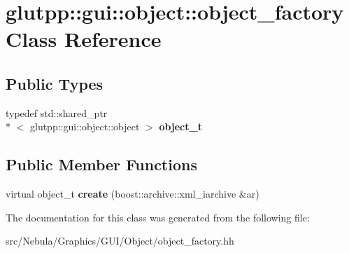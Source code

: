 \hypertarget{classglutpp_1_1gui_1_1object_1_1object__factory}{\section{glutpp\-:\-:gui\-:\-:object\-:\-:object\-\_\-factory Class Reference}
\label{classglutpp_1_1gui_1_1object_1_1object__factory}
}
\subsection*{Public Types}
\begin{DoxyCompactItemize}
\item 
\hypertarget{classglutpp_1_1gui_1_1object_1_1object__factory_a4a6e3b986deecc14be3b9f2f15dbd6f2}{typedef std\-::shared\-\_\-ptr\\*
$<$ glutpp\-::gui\-::object\-::object $>$ {\bfseries object\-\_\-t}}\label{classglutpp_1_1gui_1_1object_1_1object__factory_a4a6e3b986deecc14be3b9f2f15dbd6f2}

\end{DoxyCompactItemize}
\subsection*{Public Member Functions}
\begin{DoxyCompactItemize}
\item 
\hypertarget{classglutpp_1_1gui_1_1object_1_1object__factory_a00a2712a917a187ad3acd41132db8611}{virtual object\-\_\-t {\bfseries create} (boost\-::archive\-::xml\-\_\-iarchive \&ar)}\label{classglutpp_1_1gui_1_1object_1_1object__factory_a00a2712a917a187ad3acd41132db8611}

\end{DoxyCompactItemize}


The documentation for this class was generated from the following file\-:\begin{DoxyCompactItemize}
\item 
src/\-Nebula/\-Graphics/\-G\-U\-I/\-Object/object\-\_\-factory.\-hh\end{DoxyCompactItemize}
